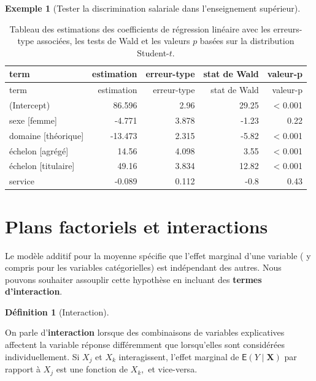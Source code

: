 \documentclass[
  11pt,
  letterpaper,
]{scrbook}
\theoremstyle{plain}
\theoremstyle{plain}
\theoremstyle{definition}
\newtheorem{example}{Exemple}[chapter]
\theoremstyle{definition}
\newtheorem{definition}{Définition}[chapter]
\theoremstyle{remark}
\begin{document}
\begin{example}[Tester la discrimination salariale dans l'enseignement
supérieur]
\begin{longtable}[]{@{}lrrrr@{}}
\caption{Tableau des estimations des coefficients de régression linéaire
avec les erreurs-type associées, les tests de Wald et les valeurs \(p\)
basées sur la distribution Student-\(t.\)}\tabularnewline
\toprule\noalign{}
term & estimation & erreur-type & stat de Wald & valeur-p \\
\midrule\noalign{}
\endfirsthead
\toprule\noalign{}
term & estimation & erreur-type & stat de Wald & valeur-p \\
\midrule\noalign{}
\endhead
\bottomrule\noalign{}
\endlastfoot
(Intercept) & 86.596 & 2.96 & 29.25 & \textless{} 0.001 \\
sexe {[}femme{]} & -4.771 & 3.878 & -1.23 & 0.22 \\
domaine {[}théorique{]} & -13.473 & 2.315 & -5.82 & \textless{} 0.001 \\
échelon {[}agrégé{]} & 14.56 & 4.098 & 3.55 & \textless{} 0.001 \\
échelon {[}titulaire{]} & 49.16 & 3.834 & 12.82 & \textless{} 0.001 \\
service & -0.089 & 0.112 & -0.8 & 0.43 \\
\end{longtable}

\end{example}

\section{Plans factoriels et
interactions}\label{plans-factoriels-et-interactions}

Le modèle additif pour la moyenne spécifie que l'effet marginal d'une
variable ( y compris pour les variables catégorielles) est indépendant
des autres. Nous pouvons souhaiter assouplir cette hypothèse en incluant
des \textbf{termes d'interaction}.

\begin{definition}[Interaction]\protect\hypertarget{def-interaction}{}\label{def-interaction}

On parle d'\textbf{interaction} lorsque des combinaisons de variables
explicatives affectent la variable réponse différemment que lorsqu'elles
sont considérées individuellement. Si \(X_j\) et \(X_k\) interagissent,
l'effet marginal de \(\mathsf{E}(Y \mid \boldsymbol{X})\) par rapport à
\(X_j\) est une fonction de \(X_k,\) et vice-versa.

\end{definition}
\end{document}
